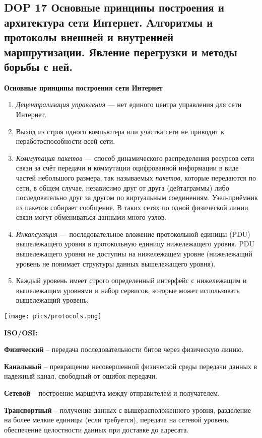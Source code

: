 \subsection*{DOP 17 Основные  принципы  построения  и  архитектура  сети  Интернет.  Алгоритмы  и  протоколы  внешней  и внутренней маршрутизации. Явление перегрузки и методы борьбы с ней.}

\textbf{Основные принципы построения сети Интернет}

\begin{enumerate}
    \item \textit{Децентрализация управления} --- нет единого центра управления для сети Интернет.
    \item Выход из строя одного компьютера или участка сети не приводит к неработоспособности всей сети.
    \item \textit{Коммутация пакетов} --- способ динамического распределения ресурсов сети связи за счёт передачи и коммутации оцифрованной информации в виде частей небольшого размера, так называемых \textit{пакетов}, которые передаются по сети, в общем случае, независимо друг от друга (дейтаграммы) либо последовательно друг за другом по виртуальным соединениям.
    Узел-приёмник из пакетов собирает сообщение.
    В таких сетях по одной физической линии связи могут обмениваться данными много узлов.
    \item \textit{Инкапсуляция} --- последовательное вложение протокольной единицы (PDU) вышележащего уровня в протокольную единицу нижележащего уровня.
    PDU вышележащего уровня не доступны на нижележащем уровне (нижележащий уровень не понимает структуры данных вышележащего уровня).
    \item Каждый уровень имеет строго определенный интерфейс с нижележащим и вышележащим уровнями и набор сервисов, которые может использовать вышележащий уровень.
\end{enumerate}

\bigbreak
\texttt{[image: pics/protocols.png]}

\textbf{ISO/OSI:}

\textbf{Физический} -- передача последовательности битов через физическую линию.

\textbf{Канальный} -- превращение несовершенной физической среды передачи данных в надежный канал, свободный от ошибок передачи.

\textbf{Сетевой} -- построение маршрута между отправителем и получателем.

\textbf{Транспортный} -- получение данных с вышерасположенного уровня, разделение на более мелкие единицы (если требуется), передача на сетевой уровень, обеспечение целостности данных при доставке до адресата.

